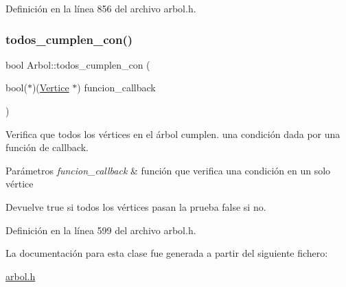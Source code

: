 Definición en la línea 856 del archivo arbol.\+h.

\mbox{\label{classArbol_aba4b09fef18152beb43e04fee7394f34}} 
\subsubsection{\texorpdfstring{todos\+\_\+cumplen\+\_\+con()}{todos\_cumplen\_con()}}
{\footnotesize\ttfamily bool Arbol\+::todos\+\_\+cumplen\+\_\+con (\begin{DoxyParamCaption}\item[{bool($\ast$)(\hyperlink{classVertice}{Vertice} $\ast$)}]{funcion\+\_\+callback }\end{DoxyParamCaption})\hspace{0.3cm}{\ttfamily [protected]}}



Verifica que todos los vértices en el árbol cumplen. una condición dada por una función de callback. 


\begin{DoxyParams}{Parámetros}
{\em funcion\+\_\+callback} & función que verifica una condición en un solo vértice \\
\hline
\end{DoxyParams}
\begin{DoxyReturn}{Devuelve}
true si todos los vértices pasan la prueba false si no. 
\end{DoxyReturn}


Definición en la línea 599 del archivo arbol.\+h.



La documentación para esta clase fue generada a partir del siguiente fichero\+:\begin{DoxyCompactItemize}
\item 
\hyperlink{arbol_8h}{arbol.\+h}\end{DoxyCompactItemize}
